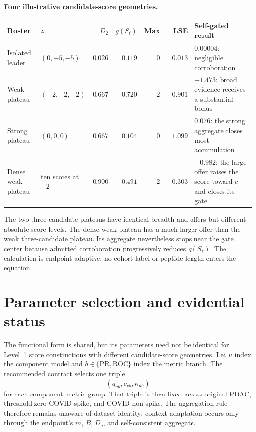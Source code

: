 \documentclass[11pt]{article}
\begin{document}
\begin{center}
\centering
\small
\textbf{Four illustrative candidate-score geometries.}

\begin{tabularx}{0.99\textwidth}{@{}>{\raggedright\arraybackslash}p{}>{\raggedright\arraybackslash}p{}rrrr>{\raggedright\arraybackslash}X@{}}
\toprule
Roster & $z$ & $D_2$ & $g(S_\ell)$ & Max & LSE & Self-gated result \\
\midrule
Isolated leader
& $(0,-5,-5)$ & $0.026$ & $0.119$ & $0$ & $0.013$
& $0.00004$: negligible corroboration \\
Weak plateau
& $(-2,-2,-2)$ & $0.667$ & $0.720$ & $-2$ & $-0.901$
& $-1.473$: broad evidence receives a substantial bonus \\
Strong plateau
& $(0,0,0)$ & $0.667$ & $0.104$ & $0$ & $1.099$
& $0.076$: the strong aggregate closes most accumulation \\
Dense weak plateau
& ten scores at $-2$ & $0.900$ & $0.491$ & $-2$ & $0.303$
& $-0.982$: the large offer raises the score toward $c$ and closes its gate \\
\bottomrule
\end{tabularx}
\end{center}

The two three-candidate plateaus have identical breadth and offers but
different absolute score levels. The dense weak plateau has a much larger
offer than the weak three-candidate plateau. Its aggregate nevertheless stops
near the gate center because admitted corroboration progressively reduces
$g(S_\ell)$. The calculation is endpoint-adaptive: no cohort label or peptide
length enters the equation.

\section{Parameter selection and evidential status}

The functional form is shared, but its parameters need not be identical for
Level~1 score constructions with different candidate-score geometries. Let
$u$ index the component model and $b\in\{\mathrm{PR},\mathrm{ROC}\}$ index the
metric branch. The recommended contract selects one triple
\begin{equation}
(q_{ub},c_{ub},\kappa_{ub})
\end{equation}
for each component--metric group. That triple is then fixed across original
PDAC, threshold-zero COVID spike, and COVID non-spike. The aggregation rule
therefore remains unaware of dataset identity: context adaptation occurs only
through the endpoint's $m$, $B$, $D_q$, and self-consistent aggregate.
\end{document}

